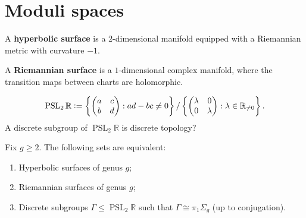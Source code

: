 \section{Moduli spaces}


\begin{definition}
  A \textbf{hyperbolic surface} is a $2$-dimensional manifold equipped with a Riemannian metric with curvature $-1$.  
\end{definition}


\begin{definition}
  A \textbf{Riemannian surface} is a $1$-dimensional complex manifold, where the transition maps between charts are holomorphic. 
\end{definition}

\begin{definition}
  $$\operatorname{PSL}_2 \mathbb{R} \vcentcolon= \left\{ \begin{pmatrix}
    a & c \\
    b & d 
  \end{pmatrix} : ad - bc \neq 0  \right\} / \left\{ \begin{pmatrix}
  \lambda & 0 \\
  0 & \lambda
  \end{pmatrix} : \lambda \in \mathbb{R}_{\neq 0} \right\}.  $$ 
  A discrete subgroup of $\operatorname{PSL}_2 \mathbb{R}$ is \TODO discrete topology?
\end{definition}

\begin{theorem}
  Fix $g \ge 2$. The following sets are equivalent:
  \begin{enumerate}
    \item Hyperbolic surfaces of genus $g$;
    \item Riemannian surfaces of genus $g$;
    \item Discrete subgroups $\Gamma \le \operatorname{PSL}_2 \mathbb{R}$ such that $\Gamma \cong \pi_1 \Sigma_g$ (up to conjugation).  
  \end{enumerate} 
\end{theorem}


